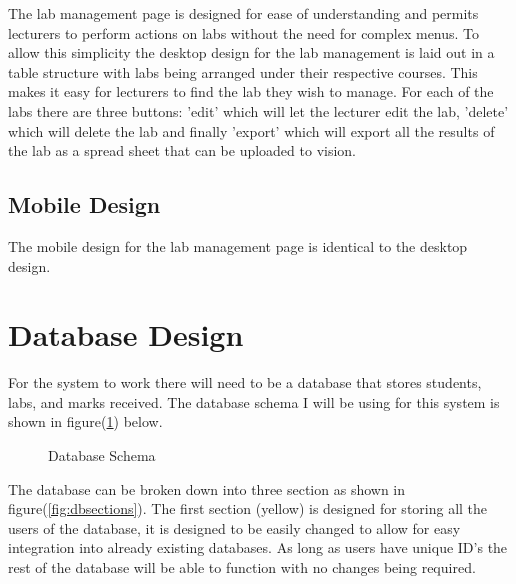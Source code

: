 \documentclass[11pt]{report}
\begin{document}
The lab management page is designed for ease of understanding and permits lecturers to perform actions on labs without the need for complex menus. To allow this simplicity the desktop design for the lab management is laid out in a table structure with labs being arranged under their respective courses. This makes it easy for lecturers to find the lab they wish to manage. For each of the labs there are three buttons: 'edit' which will let the lecturer edit the lab, 'delete' which will delete the lab and finally 'export' which will export all the results of the lab as a spread sheet that can be uploaded to vision.

\subsection*{Mobile Design}

The mobile design for the lab management page is identical to the desktop design.




\section{Database Design}
\label{sec:design-db}
For the system to work there will need to be a database that stores students, labs, and marks received. The database schema I will be using for this system is shown in figure(\ref{fig:dbschema}) below.

\begin{figure}[H]
	\caption{Database Schema}
	\label{fig:dbschema}
\end{figure}


\noindent The database can be broken down into three section as shown in figure(\ref{fig:dbsections}). The first section (yellow) is designed for storing all the users of the database, it is designed to be easily changed to allow for easy integration into already existing databases. As long as users have unique ID's the rest of the database will be able to function with no changes being required.
\end{document}
